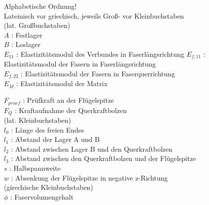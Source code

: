
Alphabetische Ordnung!\\ 
Lateinisch vor griechisch, jeweils Groß- vor Kleinbuchstaben\\
(lat. Großbuchstaben)\\

\noindent $ A $ : Festlager\\
$ B $ : Loslager\\
$ E_{11} $ : Elastizitätsmodul des Verbundes in Faserlängsrichtung
$ E_{f,11} $ : Elastizitätsmodul der Fasern in Faserlängsrichtung\\
$ E_{f,22} $ : Elastizitätsmodul der Fasern in Faserquerrichtung\\
$ E_{M} $ : Elastizitätsmodul der Matrix

$ F_{pruef} $ : Prüfkraft an der Flügelspitze\\
$ F_{Q} $ : Kraftaufnahme der Querkraftbolzen \\



\noindent (lat. Kleinbuchstaben)\\

\noindent $l_{0}$ : Länge des freien Endes\\
$l_{1}$ : Abstand der Lager A und B\\
$l_{2}$ : Abstand zwischen Lager B und den Querkraftbolzen\\
\noindent $l_{3}$ : Abstand zwischen den Querkraftbolzen und der Flügelspitze\\
$ s $ : Halbspannweite\\
$ w $ : Absenkung der Flügelspitze in negative z-Richtung\\

(girechische Kleinbuchstaben)\\
\noindent 
$ \phi  $ : Faservolumengehalt



